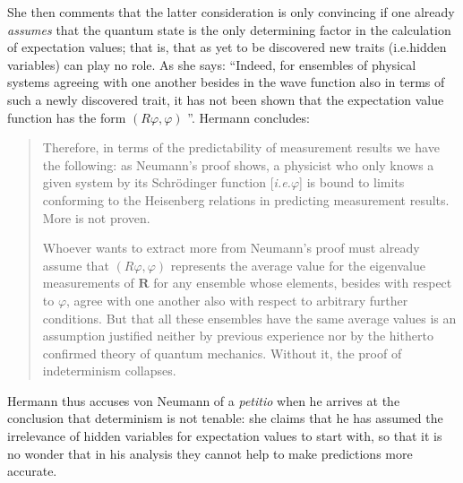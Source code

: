 \documentclass[11pt]{article}
\begin{document}
She then comments that the latter consideration is only convincing if one already \emph{assumes} that the quantum state is the only determining factor in the calculation of expectation values; that is, that as yet to be discovered new traits (i.e.\@ hidden variables) can play no role. As she says: ``Indeed, for ensembles of physical systems agreeing with one another besides in the wave function also in terms of such a newly discovered trait, it has not been shown that the expectation value function has the form $(R\varphi, \varphi)$ \cite[p.\@ 251]{crull}''.
Hermann concludes:
\begin{quote}
Therefore, in terms of the predictability of measurement results we have the following: as Neumann's proof shows, a physicist who only knows a given system by its Schr\"{o}dinger function [\emph{i.e.\@ $\varphi$}] is bound to limits conforming to the Heisenberg relations in predicting measurement results. More is not proven.

Whoever wants to extract more from Neumann's proof must already assume that $(R\varphi, \varphi)$ represents the average value for the eigenvalue measurements of $\textbf{R}$ for any ensemble whose elements, besides with respect to $\varphi$, agree with one another also with respect to arbitrary further conditions. But that all these ensembles have the same average values is an assumption justified neither by previous experience nor by the hitherto confirmed theory of quantum mechanics. Without it, the proof of indeterminism collapses.
\end{quote}


Hermann thus accuses von Neumann of a \emph{petitio} when he arrives at the conclusion that determinism is not tenable: she claims that he has assumed the irrelevance of hidden variables for expectation values to start with, so that it is no wonder that in his analysis they cannot help to make predictions more accurate.
\end{document}
